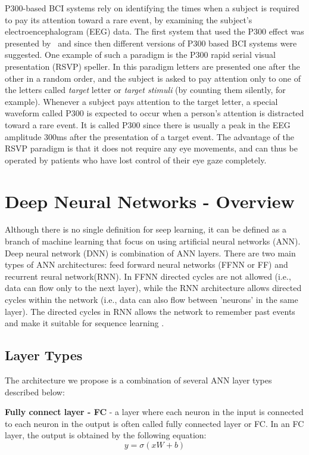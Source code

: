 \documentclass[
12pt, %
english, %
doublespacing, %
headsepline, %
]{MastersDoctoralThesis} %
\begin{document}
P300-based BCI systems rely on identifying the times when a subject is required to pay its attention toward a rare event, by examining the subject's electroencephalogram (EEG) data. The first system that used the P300 effect was presented by~\cite{FirstP300} and since then different versions of P300 based BCI systems were suggested. One example of such a paradigm is the P300 rapid serial visual presentation (RSVP) speller. In this paradigm letters are presented one after the other in a random order, and the subject is asked to pay attention only to one of the letters called \textit{target} letter or \textit{target stimuli} (by counting them silently, for example). Whenever a subject pays attention to the target letter, a special waveform called P300 is expected to occur when a person's attention is distracted toward a rare event. It is called P300 since there is usually a peak in the EEG amplitude 300ms after the presentation of a target event. The advantage of the RSVP paradigm is that it does not require any eye movements, and can thus be operated by patients who have lost control of their eye gaze completely.

\section{Deep Neural Networks - Overview}

Although there is no single definition for seep learning, it can be defined as a branch of machine learning that focus on using artificial neural networks (ANN). Deep neural network (DNN) is combination of ANN layers. There are two main types of ANN architectures: feed forward neural networks (FFNN or FF) and recurrent reural network(RNN). In FFNN directed cycles are not allowed (i.e., data can flow only to the next layer), while the RNN architecture allows directed cycles within the network (i.e., data can also flow between 'neurons' in the same layer). The directed cycles in RNN allows the network to remember past events and make it suitable for sequence learning \cite{rumelhart1985learning}.

\subsection{Layer Types}
The architecture we propose is a combination of several ANN layer types described below:

\textbf{Fully connect layer - FC} - a layer where each neuron in the input is connected to each neuron in the output is often called fully connected layer or FC. In an FC layer, the output is obtained by the following equation:
\[y=\sigma \left( {xW + b} \right)\]
\end{document}
